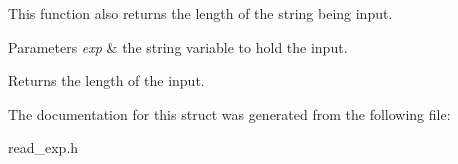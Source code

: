 This function also returns the length of the string being input. 
\begin{DoxyParams}{Parameters}
{\em exp} & the string variable to hold the input. \\
\hline
\end{DoxyParams}
\begin{DoxyReturn}{Returns}
the length of the input. 
\end{DoxyReturn}


The documentation for this struct was generated from the following file\-:\begin{DoxyCompactItemize}
\item 
read\-\_\-exp.\-h\end{DoxyCompactItemize}
